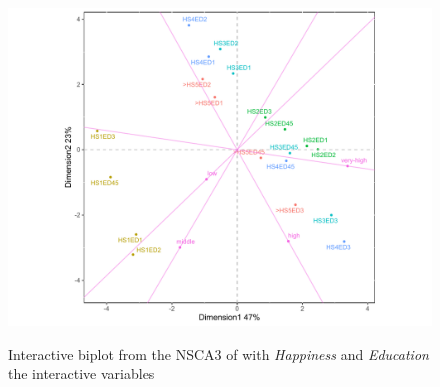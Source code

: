\begin{figure}[h!]
	\begin{center}
		{\includegraphics*[width=1.1\textwidth]{3wayca-biplot-nsca-row.pdf}}
		\caption{\label{fig.3way.happy-biplot-nsca} Interactive biplot from the NSCA3 of  with {\it Happiness} and {\it Education} the interactive variables}
	\end{center}
\end{figure}


